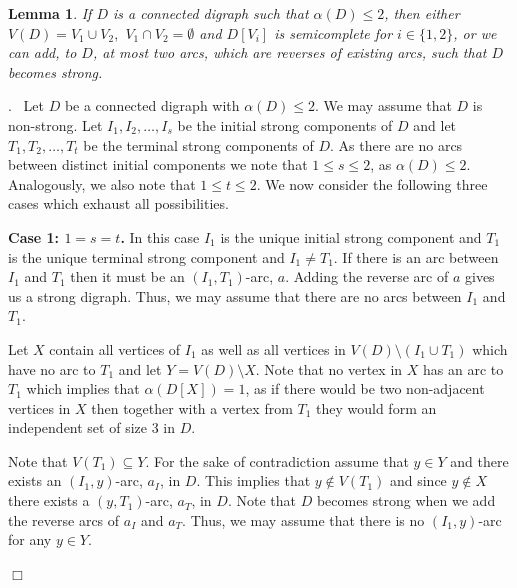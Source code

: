 \documentclass{article}
\newcommand{\2}{\vspace{2mm}}
\renewenvironment{proof}[1][]{\par \noindent {\bf Proof#1}.\ }{\hfill$\Box$
\par \vspace{11pt}}
\newtheorem{theorem}{Theorem}[section]
\newtheorem{lemma}[theorem]{Lemma}
\theoremstyle{definition}
\begin{document}
\begin{lemma}\label{adding-arcs-for-strong}
If $D$ is a connected digraph such that $\alpha(D)\le 2$, then either $V(D)=V_1\cup V_2,$  $V_1\cap V_2=\emptyset$ and $D[V_i]$ is semicomplete for $i \in \{1,2\}$, or we can add, to $D$, at most two arcs, which are reverses of existing arcs, such that $D$ becomes strong. 
\end{lemma}
\begin{proof}
Let $D$ be a connected digraph with $\alpha(D) \leq 2$. We may assume that $D$ is non-strong. 
Let $I_1,I_2,\ldots,I_s$ be the initial strong components of $D$ and let 
$T_1,T_2,\ldots, T_t$ be the terminal strong components of $D$. 
As there are no arcs between distinct initial components we note that $1 \leq s \leq 2$, as $\alpha(D) \leq 2$.
Analogously, we also note that $1 \leq t \leq 2$.  We now consider the following three cases which exhaust all possibilities.



\2

{\bf Case 1: $1=s=t$.} 
In this case $I_1$ is the unique initial strong component and $T_1$ is the unique terminal strong component and $I_1 \not= T_1$. 
If there is an arc between $I_1$ and $T_1$ then it must be an $(I_1,T_1)$-arc, $a$. Adding the reverse arc of $a$ gives us a strong digraph.
 Thus, we may assume that there are no arcs between $I_1$ and $T_1$. 

Let $X$ contain all vertices of $I_1$ as well as all vertices in $V(D) \setminus (I_1 \cup T_1)$ which have no arc to $T_1$
and let $Y = V(D) \setminus X$.
Note that no vertex in $X$ has an arc to $T_1$ which implies that $\alpha(D[X])=1$, as if there would be two non-adjacent vertices in $X$
then together with a vertex from $T_1$ they would form an independent set of size 3 in $D$.

Note that $V(T_1) \subseteq Y$. For the sake of contradiction assume that $y \in Y$ and there exists
an $(I_1,y)$-arc, $a_I$, in $D$. This implies that $y \not\in V(T_1)$ and since $y \not\in X$ there exists a
$(y,T_1)$-arc, $a_T$, in $D$. Note that $D$ becomes strong when we add the reverse arcs of $a_I$ and $a_T$. 
Thus, we may assume that there is no $(I_1,y)$-arc for any $y \in Y$.


\end{proof}
\end{document}
